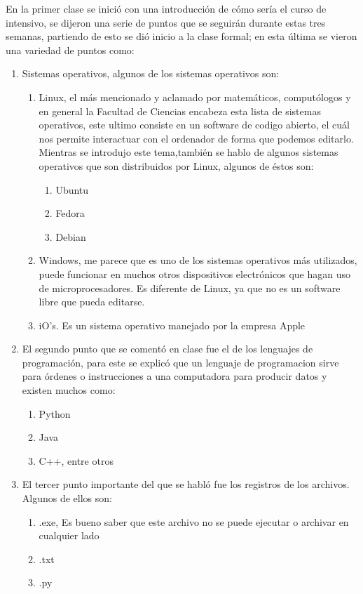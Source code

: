 \documentclass[letterpaper, 12pt, oneside]{article}
\begin{document}
	En la primer clase se inició con una introducción de cómo sería el curso de intensivo, se dijeron una serie de puntos que se seguirán durante estas tres semanas, partiendo de esto se dió inicio a la clase formal; en  esta última se vieron una variedad de puntos como:
	\begin{enumerate}
		\item
		Sistemas operativos, algunos de los sistemas operativos son:
		\begin{enumerate}
			\item 
			Linux, el más mencionado y aclamado por matemáticos, computólogos y en general la Facultad de Ciencias encabeza esta lista de sistemas operativos, este ultimo consiste en un software de codigo abierto, el cuál nos permite interactuar con el ordenador de forma que podemos editarlo. Mientras se introdujo este tema,también se hablo de algunos sistemas operativos que son distribuidos por Linux, algunos de éstos son:
			\begin{enumerate}
				\item 
				Ubuntu
				\item 
				Fedora
				\item 
				Debian
			\end{enumerate}
			\item 
			Windows, me parece que es uno de los sistemas operativos más utilizados, puede funcionar en muchos otros dispositivos electrónicos que hagan uso de microprocesadores. Es diferente de Linux, ya que no es un software libre que pueda editarse.
			\item
			iO's. Es un sistema operativo manejado por la empresa Apple
		\end{enumerate}
	\item 
	El segundo punto que se comentó en clase fue el de los lenguajes de programación, para este se explicó que un lenguaje de programacion sirve para órdenes o instrucciones a una computadora para producir datos y existen muchos como:
	\begin{enumerate}
		\item 
		Python 
		\item 
		Java
		\item 
		C++, entre otros
	\end{enumerate}
	\item 
	El tercer punto importante del que se habló fue los registros de los archivos. Algunos de ellos son:
	\begin{enumerate}
		\item
		.exe, Es bueno saber que este archivo no se puede ejecutar o archivar en cualquier lado 
		\item 
		.txt
		\item
		.py 
	\end{enumerate}
\end{enumerate}
\end{document}
